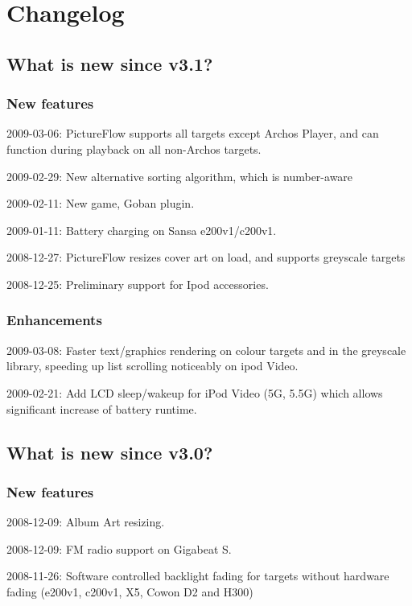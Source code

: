 \chapter{\label{ref:changelog}Changelog}
\section{What is new since v3.1?}

\subsection{New features}
\begin{changelog}
\item 2009-03-06: PictureFlow supports all targets except Archos Player, and can function during playback on all non-Archos targets.
\item 2009-02-29: New alternative sorting algorithm, which is number-aware
\item 2009-02-11: New game, Goban plugin.
\item 2009-01-11: Battery charging on Sansa e200v1/c200v1.
\item 2008-12-27: PictureFlow resizes cover art on load, and supports greyscale targets
\item 2008-12-25: Preliminary support for Ipod accessories.
\end{changelog}
\subsection{Enhancements}
\begin{changelog}
\item 2009-03-08: Faster text/graphics rendering on colour targets and in the greyscale library, speeding up list scrolling noticeably on ipod Video.
\item 2009-02-21: Add LCD sleep/wakeup for iPod Video (5G, 5.5G) which allows significant increase of battery runtime.
\end{changelog}

\section{What is new since v3.0?}

\subsection{New features}
\begin{changelog}
\item 2008-12-09: Album Art resizing.
\item 2008-12-09: FM radio support on Gigabeat S.
\item 2008-11-26: Software controlled backlight fading for targets without hardware fading (e200v1, c200v1, X5, Cowon D2 and H300)
\end{changelog}


